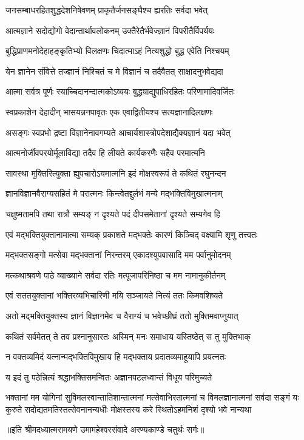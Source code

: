 \twolineshloka
{जनसम्बाधरहितशुद्धदेशनिषेवणम्}
{प्राकृतैर्जनसङ्घैश्च ह्यरतिः सर्वदा भवेत्} %

\twolineshloka
{आत्मज्ञाने सदोद्योगो वेदान्तार्थावलोकनम्}
{उक्तैरेतैर्भवेज्ज्ञानं विपरीतैर्विपर्ययः} %

\twolineshloka
{बुद्धिप्राणमनोदेहाहङ्कृतिभ्यो विलक्षणः}
{चिदात्माऽहं नित्यशुद्धो बुद्ध एवेति निश्चयम्} %

\twolineshloka
{येन ज्ञानेन संवित्ते तज्ज्ञानं निश्चितं च मे}
{विज्ञानं च तदैवैतत् साक्षादनुभवेद्यदा} %

\twolineshloka
{आत्मा सर्वत्र पूर्णः स्याच्चिदानन्दात्मकोऽव्ययः}
{बुद्ध्याद्युपाधिरहितः परिणामादिवर्जितः} %

\twolineshloka
{स्वप्रकाशेन देहादीन् भासयन्ननपावृतः}
{एक एवाद्वितीयश्च सत्यज्ञानादिलक्षणः} %

\twolineshloka
{असङ्गः स्वप्रभो द्रष्टा विज्ञानेनावगम्यते}
{आचार्यशास्त्रोपदेशाद्यैक्यज्ञानं यदा भवेत्} %

\twolineshloka
{आत्मनोर्जीवपरयोर्मूलाविद्या तदैव हि}
{लीयते कार्यकरणैः सहैव परमात्मनि} %

\twolineshloka
{सावस्था मुक्तिरित्युक्ता ह्युपचारोऽयमात्मनि}
{इदं मोक्षस्वरूपं ते कथितं रघुनन्दन} %

\twolineshloka
{ज्ञानविज्ञानवैराग्यसहितं मे परात्मनः}
{किन्त्वेतद्दुर्लभं मन्ये मद्भक्तिविमुखात्मनाम्} %

\twolineshloka
{चक्षुष्मतामपि तथा रात्रौ सम्यङ् न दृश्यते}
{पदं दीपसमेतानां दृश्यते सम्यगेव हि} %

\twolineshloka
{एवं मद्भक्तियुक्तानामात्मा सम्यक् प्रकाशते}
{मद्भक्तेः कारणं किञ्चिद् वक्ष्यामि शृणु तत्त्वतः} %

\twolineshloka
{मद्भक्तसङ्गो मत्सेवा मद्भक्तानां निरन्तरम्}
{एकादश्युपवासादि मम पर्वानुमोदनम्} %

\twolineshloka
{मत्कथाश्रवणे पाठे व्याख्याने सर्वदा रतिः}
{मत्पूजापरिनिष्ठा च मम नामानुकीर्तनम्} %

\twolineshloka
{एवं सततयुक्तानां भक्तिरव्यभिचारिणी}
{मयि सञ्जायते नित्यं ततः किमवशिष्यते} %

\twolineshloka
{अतो मद्भक्तियुक्तस्य ज्ञानं विज्ञानमेव च}
{वैराग्यं च भवेच्छीघ्रं ततो मुक्तिमवाप्नुयात्} %

\twolineshloka
{कथितं सर्वमेतत् ते तव प्रश्नानुसारतः}
{अस्मिन् मनः समाधाय यस्तिष्ठेत् स तु मुक्तिभाक्} %

\twolineshloka
{न वक्तव्यमिदं यत्नान्मद्भक्तिविमुखाय हि}
{मद्भक्ताय प्रदातव्यमाहूयापि प्रयत्नतः} %

\twolineshloka
{य इदं तु पठेन्नित्यं श्रद्धाभक्तिसमन्वितः}
{अज्ञानपटलध्वान्तं विधूय परिमुच्यते} %

\fourlineindentedshloka
{भक्तानां मम योगिनां सुविमलस्वान्तातिशान्तात्मनां}
{मत्सेवाभिरतात्मनां च विमलज्ञानात्मनां सर्वदा}
{सङ्गं यः कुरुते सदोद्यतमतिस्तत्सेवनानन्यधीः}
{मोक्षस्तस्य करे स्थितोऽहमनिशं दृश्यो भवे नान्यथा} %

{॥इति श्रीमदध्यात्मरामयणे उमामहेश्वरसंवादे
अरण्यकाण्डे चतुर्थः सर्गः॥}
